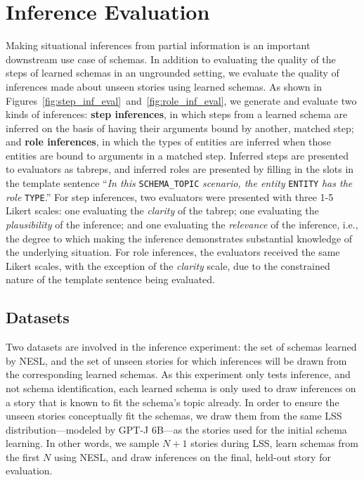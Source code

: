 \FloatBarrier
\section{Inference Evaluation}
\label{sec:inf_eval}

Making situational inferences from partial information is an important downstream use case of schemas. In addition to evaluating the quality of the steps of learned schemas in an ungrounded setting, we evaluate the quality of inferences made about unseen stories using learned schemas. As shown in Figures~\ref{fig:step_inf_eval}~and~\ref{fig:role_inf_eval}, we generate and evaluate two kinds of inferences: \textbf{step inferences}, in which steps from a learned schema are inferred on the basis of having their arguments bound by another, matched step; and \textbf{role inferences}, in which the types of entities are inferred when those entities are bound to arguments in a matched step. Inferred steps are presented to evaluators as tabreps, and inferred roles are presented by filling in the slots in the template sentence ``\textit{In this} \texttt{SCHEMA\_TOPIC} \textit{scenario, the entity} \texttt{ENTITY} \textit{has the role} \texttt{TYPE}.'' For step inferences, two evaluators were presented with three 1-5 Likert scales: one evaluating the \textit{clarity} of the tabrep; one evaluating the \textit{plausibility} of the inference; and one evaluating the \textit{relevance} of the inference, i.e., the degree to which making the inference demonstrates substantial knowledge of the underlying situation. For role inferences, the evaluators received the same Likert scales, with the exception of the \textit{clarity} scale, due to the constrained nature of the template sentence being evaluated.

\subsection{Datasets}
Two datasets are involved in the inference experiment: the set of schemas learned by NESL, and the set of unseen stories for which inferences will be drawn from the corresponding learned schemas. As this experiment only tests inference, and not schema identification, each learned schema is only used to draw inferences on a story that is known to fit the schema's topic already. In order to ensure the unseen stories conceptually fit the schemas, we draw them from the same LSS distribution---modeled by GPT-J 6B---as the stories used for the initial schema learning. In other words, we sample $N+1$ stories during LSS, learn schemas from the first $N$ using NESL, and draw inferences on the final, held-out story for evaluation.

